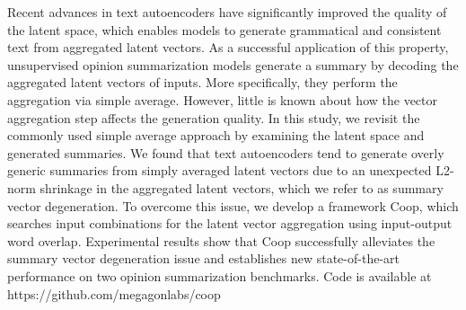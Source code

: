 Recent advances in text autoencoders have significantly improved the quality of the latent space, which enables models to generate grammatical and consistent text from aggregated latent vectors. As a successful application of this property, unsupervised opinion summarization models generate a summary by decoding the aggregated latent vectors of inputs. More specifically, they perform the aggregation via simple average. However, little is known about how the vector aggregation step affects the generation quality. In this study, we revisit the commonly used simple average approach by examining the latent space and generated summaries. We found that text autoencoders tend to generate overly generic summaries from simply averaged latent vectors due to an unexpected L2-norm shrinkage in the aggregated latent vectors, which we refer to as summary vector degeneration. To overcome this issue, we develop a framework Coop, which searches input combinations for the latent vector aggregation using input-output word overlap. Experimental results show that Coop successfully alleviates the summary vector degeneration issue and establishes new state-of-the-art performance on two opinion summarization benchmarks. Code is available at https://github.com/megagonlabs/coop
